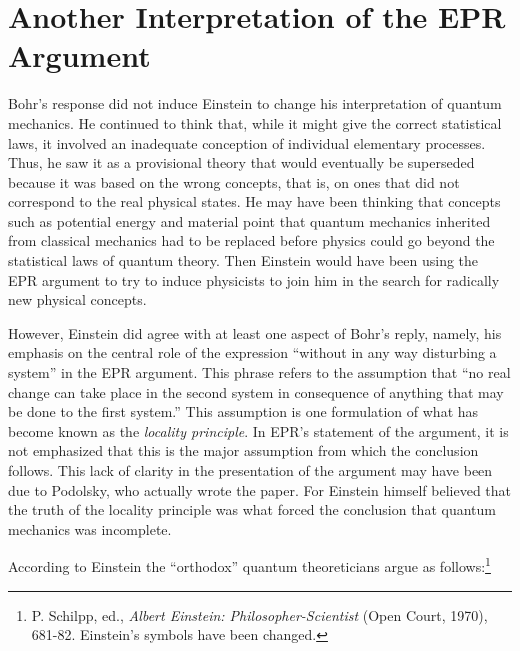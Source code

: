 \documentclass[11pt]{memoir}
\begin{document}
\section*{Another Interpretation of the EPR Argument}

Bohr's response did not induce Einstein to change his interpretation of
quantum mechanics. He continued to think that, while it might give the
correct statistical laws, it involved an inadequate conception of
individual elementary processes. Thus, he saw it as a provisional theory
that would eventually be superseded because it was based on the wrong
concepts, that is, on ones that did not correspond to the real physical
states. He may have been thinking that concepts such as potential energy
and material point that quantum mechanics inherited from classical
mechanics had to be replaced before physics could go beyond the
statistical laws of quantum theory. Then Einstein would have been using
the EPR argument to try to induce physicists to join him in the search
for radically new physical concepts.

However, Einstein did agree with at least one aspect of Bohr's reply,
namely, his emphasis on the central role of the expression ``without in
any way disturbing a system'' in the EPR argument. This phrase refers to
the assumption that ``no real change can take place in the second system
in consequence of anything that may be done to the first system.'' This
assumption is one formulation of what has become known as the
\emph{locality principle}. In EPR's statement of the argument, it is not
emphasized that this is the major assumption from which the conclusion
follows. This lack of clarity in the presentation of the argument may
have been due to Podolsky, who actually wrote the paper. For Einstein
himself believed that the truth of the locality principle was what
forced the conclusion that quantum mechanics was incomplete.

According to Einstein the ``orthodox'' quantum theoreticians argue as
follows:\footnote{P. Schilpp, ed., \emph{Albert Einstein:
  Philosopher-Scientist} (Open Court, 1970), 681-82. Einstein's symbols
  have been changed.}
\end{document}
